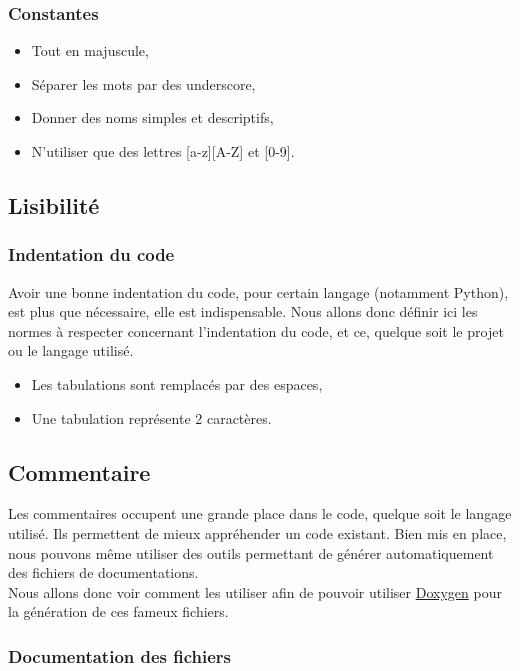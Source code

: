\subsubsection{Constantes}
\label{nommageConstantes}

\begin{itemize}[label=\textbullet]
  \item Tout en majuscule,
  \item Séparer les mots par des underscore,
  \item Donner des noms simples et descriptifs,
  \item N'utiliser que des lettres [a-z][A-Z] et [0-9].
\end{itemize}

\subsection{Lisibilité}

\subsubsection{Indentation du code}
Avoir une bonne indentation du code, pour certain langage (notamment Python), est plus que nécessaire, elle est indispensable. Nous allons donc définir ici les normes à respecter concernant l'indentation du code, et ce, quelque soit le projet ou le langage utilisé.

\begin{itemize}[label=\textbullet]
  \item Les tabulations sont remplacés par des espaces,
  \item Une tabulation représente 2 caractères.
\end{itemize}

\subsection{Commentaire}
Les commentaires occupent une grande place dans le code, quelque soit le langage utilisé. Ils permettent de mieux appréhender un code existant. Bien mis en place, nous pouvons même utiliser des outils permettant de générer automatiquement des fichiers de documentations.\\
Nous allons donc voir comment les utiliser afin de pouvoir utiliser \href{http://www.stack.nl/~dimitri/doxygen/}{Doxygen} pour la génération de ces fameux fichiers.\\

\subsubsection{Documentation des fichiers}

